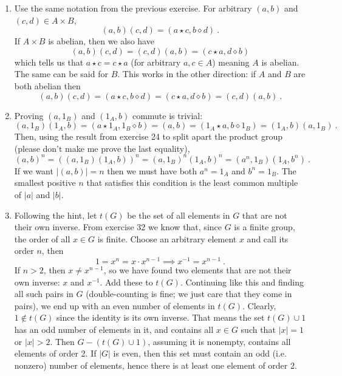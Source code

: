 \documentclass[]{article}
\newcommand{\abs}[1]{\left\vert #1 \right\vert}
\begin{document}
\begin{enumerate}
\item Use the same notation from the previous exercise. For arbitrary $(a,b)$ and $(c,d) \in A\times B$, 
\begin{equation}
(a,b)(c,d) = (a\star c,b\diamond d)\ .
\end{equation}
If $A\times B$ is abelian, then we also have
\begin{equation}
(a,b)(c,d) = (c,d)(a,b) = (c\star a, d\diamond b)
\end{equation}
which tells us that $a\star c = c\star a$ (for arbitrary $a,c\in A$) meaning $A$ is abelian. The same can be said for $B$. This works in the other direction: if $A$ and $B$ are both abelian then 
\begin{equation}
(a,b)(c,d) = (a\star c, b\diamond d) = (c\star a, d\diamond b) = (c,d)(a,b)\ .
\end{equation}


\item Proving $(a,1_B)$ and $(1_A,b)$ commute is trivial:
\begin{equation}
(a,1_B)(1_A,b) = (a\star 1_A, 1_B\diamond b) = (a,b) = (1_A\star a, b\diamond 1_B) = (1_A,b)(a,1_B)\ .
\end{equation}
Then, using the result from exercise 24 to split apart the product group (please don't make me prove the last equality),
\begin{equation}
(a,b)^n = \left( (a,1_B)(1_A,b) \right)^n = (a,1_B)^n (1_A,b)^n = (a^n,1_B)(1_A,b^n)\ .
\end{equation}
If we want $\abs{(a,b)} = n$ then we must have both $a^n = 1_A$ and $b^n = 1_B$. The smallest positive $n$ that satisfies this condition is the least common multiple of $\abs{a}$ and $\abs{b}$.


\item Following the hint, let $t(G)$ be the set of all elements in $G$ that are not their own inverse. From exercise 32 we know that, since $G$ is a finite group, the order of all $x \in G$ is finite. Choose an arbitrary element $x$ and call its order $n$, then 
\begin{equation}
1 = x^n = x\cdot x^{n-1} \implies x^{-1} = x^{n-1}\ .
\end{equation}
If $n > 2$, then $x \neq x^{n-1}$, so we have found two elements that are not their own inverse: $x$ and $x^{-1}$. Add these to $t(G)$. Continuing like this and finding all such pairs in $G$ (double-counting is fine; we just care that they come in pairs), we end up with an even number of elements in $t(G)$. Clearly, $1 \notin t(G)$ since the identity is its own inverse. That means the set $t(G) \cup {1}$ has an odd number of elements in it, and contains all $x \in G$ such that $\abs{x} = 1$ or $\abs{x} > 2$. Then $G - (t(G) \cup {1})$, assuming it is nonempty, contains all elements of order 2. If $\abs{G}$ is even, then this set must contain an odd (i.e. nonzero) number of elements, hence there is at least one element of order 2.



\end{enumerate}
\end{document}

